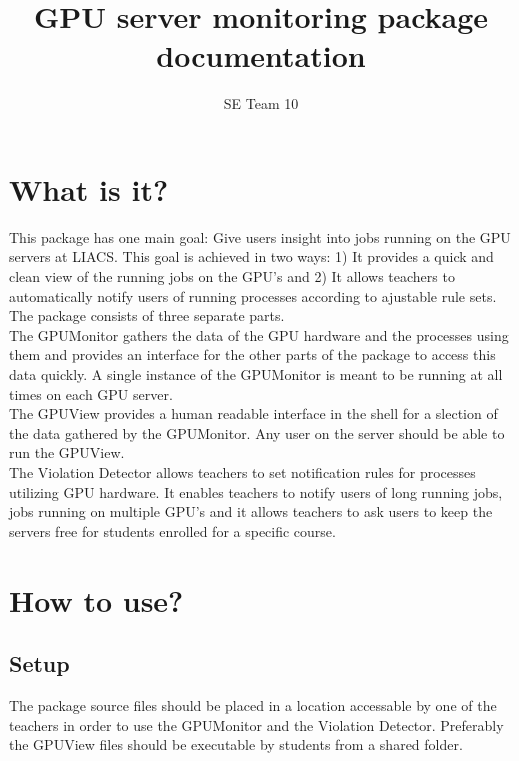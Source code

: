 \documentclass[10pt]{article}
\title{GPU server monitoring package documentation}
\author{SE Team 10}
\begin{document}

\maketitle

\section{What is it?}

    This package has one main goal: Give users insight into jobs running 
    on the GPU servers at LIACS. This goal is achieved in two ways: 1) 
    It provides a quick and clean view of the running jobs on the GPU's
    and 2) It allows teachers to automatically notify users of running
    processes according to ajustable rule sets.\\

    The package consists of three separate parts.\\
    The GPUMonitor gathers the data of the GPU hardware and the processes 
    using them and provides an interface for the other parts of the package 
    to access this data quickly. A single instance of the GPUMonitor is 
    meant to be running at all times on each GPU server.\\

    The GPUView provides a human readable interface in the shell for a 
    slection of the data gathered by the GPUMonitor. Any user on the server
    should be able to run the GPUView.\\
    
    The Violation Detector allows teachers to set notification rules for
    processes utilizing GPU hardware. It enables teachers to notify users
    of long running jobs, jobs running on multiple GPU's and it allows 
    teachers to ask users to keep the servers free for students enrolled
    for a specific course.

\section{How to use?}
\subsection{Setup}
The package source files should be placed in a location accessable 
by one of the teachers in order to use the GPUMonitor and the 
Violation Detector. Preferably the GPUView files should be executable
by students from a shared folder.
\end{document}
